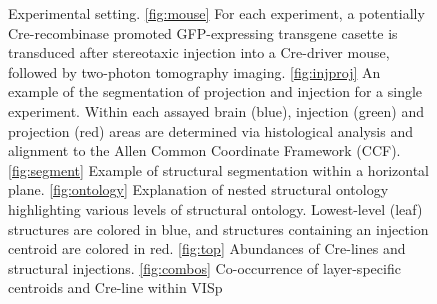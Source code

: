 \newpage
\begin{figure}[H]
    \newline
    \caption{Experimental setting.  \ref{fig:mouse}  For each experiment, a potentially Cre-recombinase promoted GFP-expressing transgene casette is transduced after stereotaxic injection into a Cre-driver mouse, followed by two-photon tomography imaging. \ref{fig:injproj} An example of the segmentation of projection and injection for a single experiment. Within each assayed brain (blue), injection (green) and projection (red) areas are determined via histological analysis and alignment to the Allen Common Coordinate Framework (CCF).   \ref{fig:segment} Example of structural segmentation within a horizontal plane. \ref{fig:ontology} Explanation of nested structural ontology highlighting various levels of structural ontology.  Lowest-level (leaf) structures are colored in blue, and structures containing an injection centroid are colored in red. \ref{fig:top}  Abundances of Cre-lines and structural injections. \ref{fig:combos}  Co-occurrence of layer-specific centroids and Cre-line within VISp  }
    \label{fig:data}
\end{figure}

